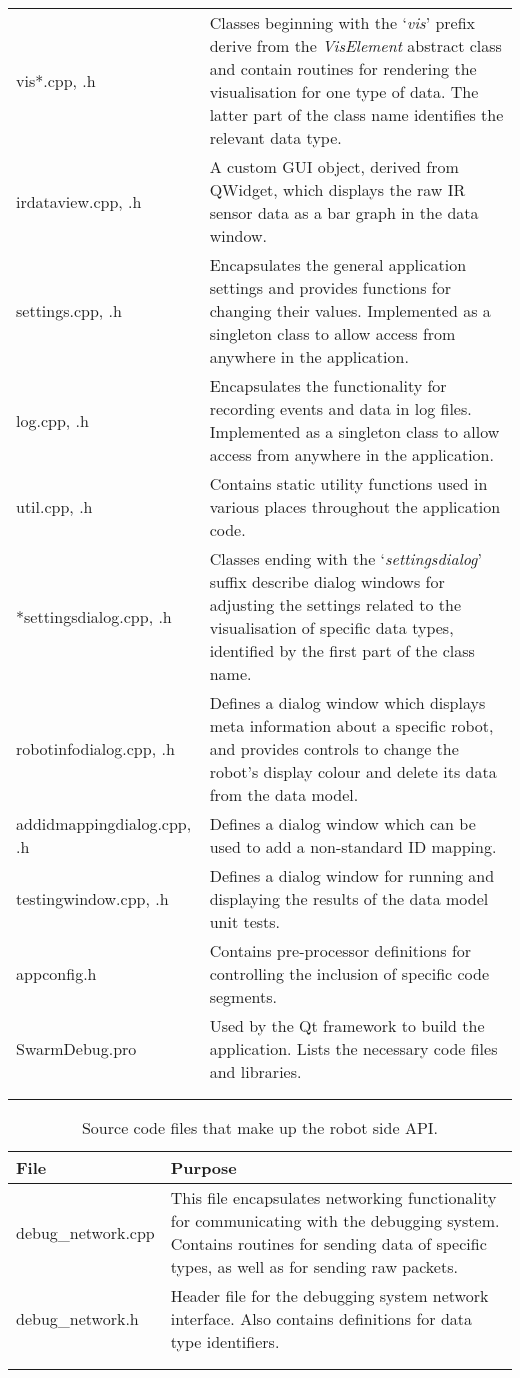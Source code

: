 \begin{longtable}{ l p{10cm} }
 vis*.cpp, .h & Classes beginning with the `\textit{vis}' prefix derive from the \textit{VisElement} abstract class and contain routines for rendering the visualisation for one type of data. The latter part of the class name identifies the relevant data type.\\
 irdataview.cpp, .h & A custom GUI object, derived from QWidget, which displays the raw IR sensor data as a bar graph in the data window.\\
 settings.cpp, .h & Encapsulates the general application settings and provides functions for changing their values. Implemented as a singleton class to allow access from anywhere in the application.\\
 log.cpp, .h & Encapsulates the functionality for recording events and data in log files. Implemented as a singleton class to allow access from anywhere in the application.\\
 util.cpp, .h & Contains static utility functions used in various places throughout the application code.\\
 *settingsdialog.cpp, .h & Classes ending with the `\textit{settingsdialog}' suffix describe dialog windows for adjusting the settings related to the visualisation of specific data types, identified by the first part of the class name.\\
 robotinfodialog.cpp, .h & Defines a dialog window which displays meta information about a specific robot, and provides controls to change the robot's display colour and delete its data from the data model.\\
 addidmappingdialog.cpp, .h & Defines a dialog window which can be used to add a non-standard ID mapping.\\
 testingwindow.cpp, .h & Defines a dialog window for running and displaying the results of the data model unit tests.\\
 appconfig.h & Contains pre-processor definitions for controlling the inclusion of specific code segments.\\
 SwarmDebug.pro & Used by the Qt framework to build the application. Lists the necessary code files and libraries.\\
 \bottomrule\\
	
 \label{tab:CodeFiles}
\end{longtable}

\clearpage
\begin{longtable}{ l p{10cm} }
\caption[Robot-side Code Files]{Source code files that make up the robot side API.}\\
 File & Purpose\\
 \hline
 debug\_network.cpp & This file encapsulates networking functionality for communicating with the debugging system. Contains routines for sending data of specific types, as well as for sending raw packets.\\
 debug\_network.h & Header file for the debugging system network interface. Also contains definitions for data type identifiers.\\
 \bottomrule\\
	
 \label{tab:RobotCodeFiles}
\end{longtable}